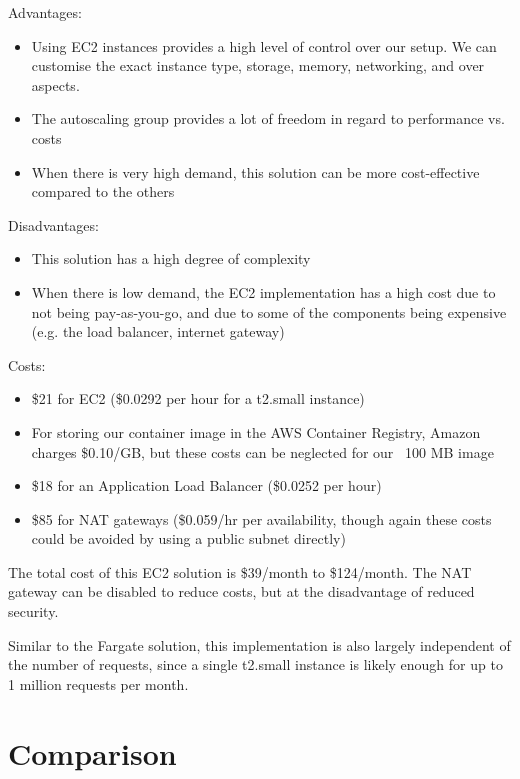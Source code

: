 Advantages:
\begin{itemize}
\item Using EC2 instances provides a high level of control over our setup. We can customise the exact instance type, storage, memory, networking, and over aspects.
\item The autoscaling group provides a lot of freedom in regard to performance vs. costs
\item When there is very high demand, this solution can be more cost-effective compared to the others
\end{itemize}

Disadvantages:
\begin{itemize}
\item This solution has a high degree of complexity
\item When there is low demand, the EC2 implementation has a high cost due to not being pay-as-you-go, and due to some of the components being expensive (e.g. the load balancer, internet gateway)
\end{itemize}

Costs:
\begin{itemize}
\item \$21 for EC2 (\$0.0292 per hour for a t2.small instance)
\item For storing our container image in the AWS Container Registry, Amazon charges \$0.10/GB, but these costs can be neglected for our ~100 MB image
\item \$18 for an Application Load Balancer (\$0.0252 per hour)
\item \$85 for NAT gateways (\$0.059/hr per availability, though again these costs could be avoided by using a public subnet directly)
\end{itemize}

The total cost of this EC2 solution is \$39/month to \$124/month. The NAT gateway can be disabled to reduce costs, but at the disadvantage of reduced security.

Similar to the Fargate solution, this implementation is also largely independent of the number of requests, since a single t2.small instance is likely enough for up to 1 million requests per month.

\section{Comparison}

